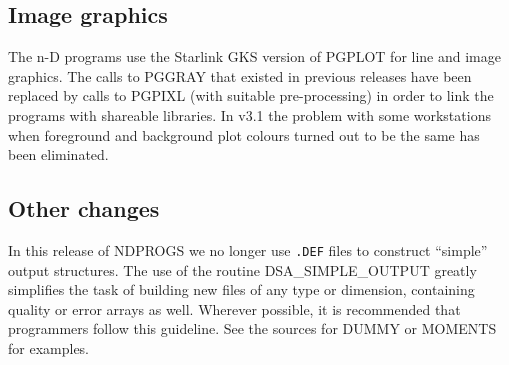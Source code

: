 \subsection{Image graphics}
\label{image}

The n-D programs use the Starlink GKS version of PGPLOT for line and image 
graphics. The calls to PGGRAY that existed in previous releases have been
replaced by calls to PGPIXL (with suitable pre-processing) in order to link
the programs with shareable libraries. In v3.1 the problem with some
workstations when foreground and background plot colours turned out to be the
same has been eliminated.

\subsection{Other changes}

In this release of NDPROGS we no longer use {\tt .DEF} files to
construct ``simple'' output structures. The use of the routine
DSA\_SIMPLE\_OUTPUT greatly simplifies the task of building new files of any 
type or dimension, containing quality or error arrays as well. Wherever 
possible, it is recommended that programmers follow this guideline. See the 
sources for DUMMY or MOMENTS for examples.


